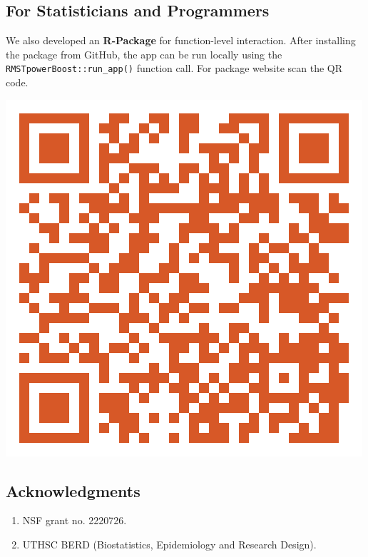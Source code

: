 \documentclass[a0,landscape]{a0poster}
\begin{document}
\begin{minipage}[t]{0.5\linewidth}
    \subsection*{\Large For Statisticians and Programmers}
    \Large We also developed an \textbf{R-Package} for function-level interaction. After installing the package from GitHub, the app can be run locally using the \verb|RMSTpowerBoost::run_app()| function call. For package website scan the QR code.
\end{minipage}
\hfill
\begin{minipage}[c]{0.1\linewidth}
    \centering
    \includegraphics[height=\linewidth, width=\linewidth]{images/package-qr-code.png}
\end{minipage}
\hfill
\begin{minipage}[t]{0.3\linewidth}
    \subsection*{\Large Acknowledgments}
    \begin{enumerate}
        \item \Large NSF grant no. 2220726.
        \item \Large UTHSC BERD (Biostatistics, Epidemiology and Research Design).
    \end{enumerate}
\end{minipage}
\end{document}
